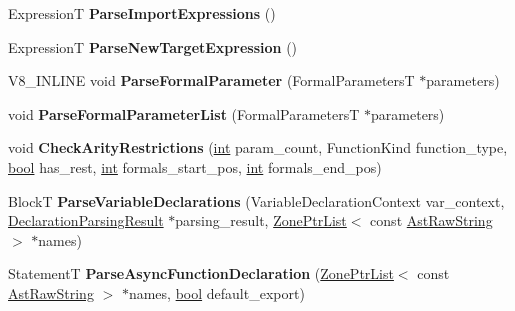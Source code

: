 \begin{DoxyCompactItemize}
\mbox{\label{classv8_1_1internal_1_1ParserBase_a457b993088c15175646dc28d301206b4}} 
ExpressionT {\bfseries Parse\+Import\+Expressions} ()
\item 
\mbox{\label{classv8_1_1internal_1_1ParserBase_ac14a3f7d4625d6fe00a8efebe4130326}} 
ExpressionT {\bfseries Parse\+New\+Target\+Expression} ()
\item 
\mbox{\label{classv8_1_1internal_1_1ParserBase_a864b4805d0c5800b44ca94a811cce4e7}} 
V8\+\_\+\+I\+N\+L\+I\+NE void {\bfseries Parse\+Formal\+Parameter} (Formal\+ParametersT $\ast$parameters)
\item 
\mbox{\label{classv8_1_1internal_1_1ParserBase_a18bdb0084ff72ae9476ebf2ae40c95ed}} 
void {\bfseries Parse\+Formal\+Parameter\+List} (Formal\+ParametersT $\ast$parameters)
\item 
\mbox{\label{classv8_1_1internal_1_1ParserBase_a59a317ebb37bbba9f1138b50503b2897}} 
void {\bfseries Check\+Arity\+Restrictions} (\mbox{\hyperlink{classint}{int}} param\+\_\+count, Function\+Kind function\+\_\+type, \mbox{\hyperlink{classbool}{bool}} has\+\_\+rest, \mbox{\hyperlink{classint}{int}} formals\+\_\+start\+\_\+pos, \mbox{\hyperlink{classint}{int}} formals\+\_\+end\+\_\+pos)
\item 
\mbox{\label{classv8_1_1internal_1_1ParserBase_a7884cbea852ae7ed26de68a679b874e7}} 
BlockT {\bfseries Parse\+Variable\+Declarations} (Variable\+Declaration\+Context var\+\_\+context, \mbox{\hyperlink{structv8_1_1internal_1_1ParserBase_1_1DeclarationParsingResult}{Declaration\+Parsing\+Result}} $\ast$parsing\+\_\+result, \mbox{\hyperlink{classv8_1_1internal_1_1ZoneList}{Zone\+Ptr\+List}}$<$ const \mbox{\hyperlink{classv8_1_1internal_1_1AstRawString}{Ast\+Raw\+String}} $>$ $\ast$names)
\item 
\mbox{\label{classv8_1_1internal_1_1ParserBase_a1db08187896d3f632a128b1b1393840c}} 
StatementT {\bfseries Parse\+Async\+Function\+Declaration} (\mbox{\hyperlink{classv8_1_1internal_1_1ZoneList}{Zone\+Ptr\+List}}$<$ const \mbox{\hyperlink{classv8_1_1internal_1_1AstRawString}{Ast\+Raw\+String}} $>$ $\ast$names, \mbox{\hyperlink{classbool}{bool}} default\+\_\+export)

\end{DoxyCompactItemize}
